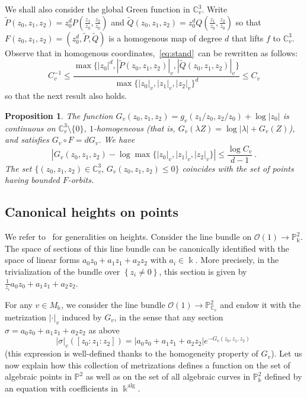 \documentclass[11 pt, oneside, a4paper]{amsart}
\newcommand{\C}{\mathbb{C}}
\newcommand{\nP}{\mathbb{P}}
\newcommand{\mc}{\mathcal}
\newcommand{\wt}{\widetilde}
\newcommand{\abs}[1]{{\left|{#1}\right|}}
\newcommand{\set}[1]{{\left\{#1\right\}}}
\newcommand{\nk}{\Bbbk}
\DeclareMathOperator{\alg}{alg}
\newcommand{\unsur}[1]{\frac{1}{#1}}
\newtheorem{prop}[thm]{Proposition}
\theoremstyle{definition}
\theoremstyle{definition}
\begin{document}
We shall also consider  the global Green function in $\C_v^3$. 
Write $\wt{P}(z_0,z_1,z_2) = z_0^dP(\frac{z_1}{z_0},\frac{z_2}{z_0})$ and $\wt{Q}(z_0,z_1,z_2) = z_0^dQ(\frac{z_1}{z_0},\frac{z_2}{z_0})$
so that $F (z_0, z_1, z_2) = (z_0 ^d, \wt{P}, \wt{Q}) $ is a homogenous map of degree $d$ that lifts $f$ to $\C_v^3$. 
Observe that in homogenous coordinates,~\eqref{eq:stand} can be rewritten as follows: 
\[
C_v^{-1}
\le
\frac{ \max\{|z_0|^d,|\wt{P}(z_0, z_1, z_2)|_v,|\wt{Q}(z_0, z_1, z_2)|_v\}}
{\max\{|z_0|_v,|z_1|_v,|z_2|_v\}^d}
\le
C_v
\]
so that the next result also holds. 
\begin{prop}\label{prop:green_global}
The function $G_v(z_0,z_1,z_2) = g_v( z_1/z_0, z_2/z_0) + \log|z_0|$
is continuous on $\C^3_v\setminus \{0\}$, $1$-homogeneous (that is, $G_v(\lambda Z) = \log\abs{\lambda}+G_v(Z)$), 
and satisfies
$G_v \circ F = d G_v$. 
We have
\[
\abs{G_v(z_0,z_1,z_2) - \log \max\{|z_0|_v,|z_1|_v,|z_2|_v\} } \le \frac{\log C_v}{d-1}
~.\]
The set $\{(z_0,z_1,z_2) \in \C_v^3,\, G_v(z_0,z_1,z_2)\le 0\}$ coincides with the set of points having bounded $F$-orbits.
\end{prop}


 

\subsection{Canonical heights on points}
We refer to~\cite{ACL2} for generalities on heights.
Consider the line bundle on $\mc{O}(1)\to \nP^2_\nk$. The space of sections of this line bundle
can be canonically identified with the space of linear forms  
$a_0 z_0 + a_1 z_1 + a_2 z_2$ with $a_i \in \nk$. More precisely, in the trivialization of the bundle 
over $\set{z_i\neq 0}$, this section is given by 
$\unsur{z_i} a_0 z_0 + a_1 z_1 + a_2 z_2$.  

For any $v\in M_\nk$, we consider the line bundle $\mc{O}(1)\to \nP^2_{\C_v}$ and endow it with the
metrization $|\cdot|_v$ induced by $G_v$, in the sense that 
any section  $\sigma = a_0 z_0 + a_1 z_1 + a_2 z_2$ as above 
\begin{equation}\label{eq:metriz}
|\sigma|_v ([z_0:z_1:z_2]) = \abs{a_0 z_0 + a_1 z_1 + a_2 z_2} 
  e^{-G_v(z_0, z_1, z_2)} ~
\end{equation}
(this expression is well-defined thanks to the homogeneity property of $G_v$). 
Let us now explain how this collection of metrizations defines a function on the set of algebraic points in $\nP^2$
as well as on the set of all algebraic curves in $\nP^2_\nk$ defined by an equation 
with coefficients in $\nk^{\alg}$.
\end{document}
